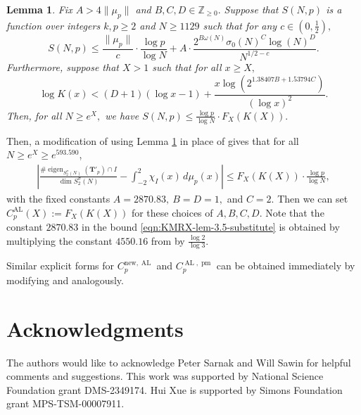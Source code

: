 \documentclass[11pt,letterpaper,reqno]{amsart}
\newtheorem{lemma}[theorem]{Lemma}
\theoremstyle{definition}
\numberwithin{equation}{section}
\numberwithin{figure}{section}
\numberwithin{table}{section}
\newcommand{\nw}{\mathrm{new}}
\begin{document}
\begin{lemma}\label{lem:KMRX-lem-3.4-substitute}
    Fix $A > 4 \| \mu_p \|$ and $B, C, D \in \mathbb{Z}_{\geq 0}.$ Suppose that $S(N, p)$ is a function over integers $k, p \geq 2$ and $N \geq 1129$ such that for any $c \in \left( 0, \frac{1}{2} \right),$
    $$S(N, p) \leq \frac{\| \mu_p \|}{c} \cdot \frac{\log p}{\log N} + A \cdot \frac{2^{ B\omega(N)} \sigma_0(N)^C \log(N)^D}{N^{1/2 - c}}.$$
    Furthermore, suppose that $X > 1$ such that for all $x \geq X,$
    \begin{equation}
            \log K(x) < (D + 1) \left( \log x - 1 \right) + \frac{x \log\left( 2^{1.38407B +  1.53794C} \right)}{\left( \log x \right)^2}.
        \end{equation}
    Then, for all $N \geq e^X,$ we have $S(N, p) \leq \frac{\log p}{\log N} \cdot F_X(K(X)).$
\end{lemma}

Then, a modification of \cite[Lemma 3.5]{KMRX} using Lemma \ref{lem:KMRX-lem-3.4-substitute} in place of \cite[Lemma 3.4]{KMRX} gives that for all $N \geq e^X \geq e^{593.590}$,
\begin{align}
    \left| \frac{\# \operatorname{eigen}_{S_2^\sigma(N)}(\mathbf{T}'_p) \cap I}{\dim S_2^\sigma(N)} - \int_{-2}^2 \chi_I (x) \, d \mu_p(x)  \right| \leq F_{X}(K(X)) \cdot \frac{\log p}{\log N}, \label{eqn:KMRX-lem-3.5-substitute}
\end{align}
with the fixed constants $A = 2870.83, \ B = D = 1,$ and $C = 2.$ Then we can set $C_p^{\operatorname{AL}}(X) := F_X(K(X))$ for these choices of $A,B,C,D$.
Note that the constant $2870.83$ in the bound \eqref{eqn:KMRX-lem-3.5-substitute} is obtained by multiplying the constant $4550.16$ from \cite[Lemma 3.5]{KMRX} by $\frac{\log 2}{\log 3}$. 

Similar explicit forms for $C_p^{\nw, \operatorname{AL}}$ and $C_p^{\operatorname{AL}, \operatorname{pm}}$ can be obtained immediately by modifying \cite[Lemma 3.6]{KMRX} and \cite[Lemma 3.8]{KMRX} analogously.

\section*{Acknowledgments}

The authors would like to acknowledge Peter Sarnak and Will Sawin for helpful comments and suggestions. This work was supported by National Science Foundation grant DMS-2349174. Hui Xue is supported by Simons Foundation grant MPS-TSM-00007911.




\end{document}
